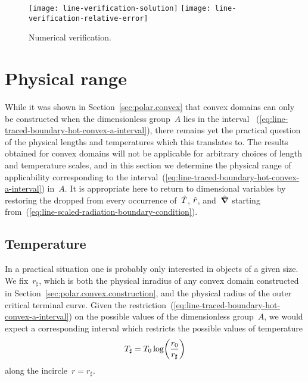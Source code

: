\begin{figure}
  \newcommand*{\subfigurewidth}{0.42\textwidth}
  \centering
  \hspace*{\fill}
  \texttt{[image: line-verification-solution]}
    \hfill
  \texttt{[image: line-verification-relative-error]}
  \hspace*{\fill}
  \caption{
    Numerical verification.
  }
  \label{fig:line-verification}
\end{figure}

\section{Physical range}
\label{sec:polar.physical}

While it was shown in Section~\ref{sec:polar.convex} that
convex domains can only be constructed
when the dimensionless group~$A$ lies in the interval~%
  (\ref{eq:line-traced-boundary-hot-convex-a-interval}),
there remains yet the practical question of
the physical lengths and temperatures which this translates to.
The results obtained for convex domains
will not be applicable for arbitrary choices
of length and temperature scales,
and in this section we determine the physical range of applicability
corresponding to
the interval~(\ref{eq:line-traced-boundary-hot-convex-a-interval}) in~$A$.
It is appropriate here to return to dimensional variables
by restoring the \scalingmarks{} dropped
from every occurrence of~$\hat{T}$, $\hat{r}$, and~$\mathop{}\!\hat{\mathop{}\!\boldsymbol{\mathbf{\nabla}}}$
starting from~(\ref{eq:line-scaled-radiation-boundary-condition}).

\subsection{Temperature}
\label{sec:polar.physical.temperature}

In a practical situation
one is probably only interested in objects of a given size.
We fix~$r_\sharp$, which is both the physical inradius of any convex domain
constructed in Section~\ref{sec:polar.convex.construction},
and the physical radius of the outer critical terminal curve.
Given the restriction~(\ref{eq:line-traced-boundary-hot-convex-a-interval})
on the possible values of the dimensionless group~$A$,
we would expect a corresponding interval
which restricts the possible values of temperature
\begin{equation}
  T_\sharp = T_0 \log \roundbr*{\frac{r_0}{r_\sharp}}
  \label{eq:line-t-sharp}
\end{equation}
along the incircle~$r = r_\sharp$.

